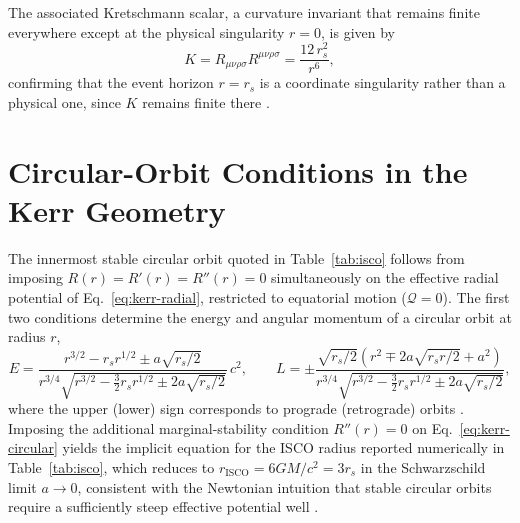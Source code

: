 The associated Kretschmann scalar, a curvature invariant that remains finite everywhere except at the physical singularity $r=0$, is given by
\begin{equation}
	K = R_{\mu\nu\rho\sigma}R^{\mu\nu\rho\sigma} = \frac{12\,r_s^2}{r^6},
	\label{eq:kretschmann}
\end{equation}
confirming that the event horizon $r=r_s$ is a coordinate singularity rather than a physical one, since $K$ remains finite there \cite{misner1973}.

\section*{Circular-Orbit Conditions in the Kerr Geometry}

The innermost stable circular orbit quoted in Table~\ref{tab:isco} follows from imposing $R(r)=R'(r)=R''(r)=0$ simultaneously on the effective radial potential of Eq.~\eqref{eq:kerr-radial}, restricted to equatorial motion ($\mathcal{Q}=0$). The first two conditions determine the energy and angular momentum of a circular orbit at radius $r$,
\begin{equation}
	E = \frac{r^{3/2} - r_s r^{1/2} \pm a\sqrt{r_s/2}}{r^{3/4}\sqrt{r^{3/2} - \tfrac{3}{2}r_s r^{1/2} \pm 2a\sqrt{r_s/2}}}\,c^2, \qquad
	L = \pm\frac{\sqrt{r_s/2}\left(r^2 \mp 2a\sqrt{r_s r/2} + a^2\right)}{r^{3/4}\sqrt{r^{3/2}-\tfrac{3}{2}r_s r^{1/2}\pm 2a\sqrt{r_s/2}}},
	\label{eq:kerr-circular}
\end{equation}
where the upper (lower) sign corresponds to prograde (retrograde) orbits \cite{bardeen1972}. Imposing the additional marginal-stability condition $R''(r)=0$ on Eq.~\eqref{eq:kerr-circular} yields the implicit equation for the ISCO radius reported numerically in Table~\ref{tab:isco}, which reduces to $r_{\text{ISCO}}=6GM/c^2=3r_s$ in the Schwarzschild limit $a\to 0$, consistent with the Newtonian intuition that stable circular orbits require a sufficiently steep effective potential well \cite{chandrasekhar1983}.